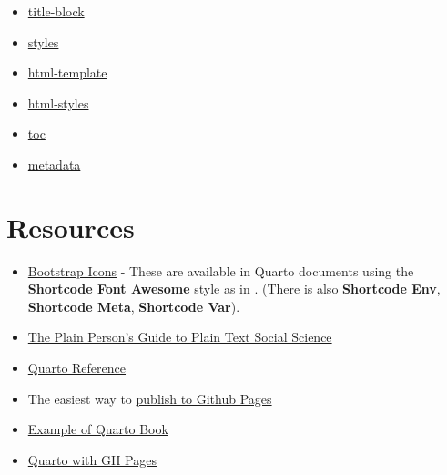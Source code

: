 \documentclass[
  10pt,
  oneside,
  cleardoublepage=empty,
  numbers=noenddot,
  titlepage,
  toclink=all,
  toc=bibliography,
  headinclude,
  footinclude]{scrbook}
\providecommand{\tightlist}{%
  \setlength{\itemsep}{0pt}\setlength{\parskip}{0pt}}\usepackage{longtable,booktabs,array}
\theoremstyle{plain}
\theoremstyle{plain}
\theoremstyle{definition}
\theoremstyle{definition}
\theoremstyle{plain}
\theoremstyle{plain}
\theoremstyle{definition}
\theoremstyle{plain}
\theoremstyle{remark}
\begin{document}
\begin{tcolorbox}[enhanced jigsaw, bottomrule=.15mm, bottomtitle=1mm, rightrule=.15mm, opacityback=0, coltitle=black, colback=white, left=2mm, arc=.35mm, colbacktitle=quarto-callout-note-color!10!white, breakable, toptitle=1mm, colframe=quarto-callout-note-color-frame, toprule=.15mm, titlerule=0mm, title=\textcolor{quarto-callout-note-color}{\faInfo}\hspace{0.5em}{HTML}, leftrule=.75mm, opacitybacktitle=0.6]

\begin{itemize}
\tightlist
\item
  \href{_extensions/templates/html/title-block.html}{title-block}
\item
  \href{_extensions/templates/html/styles.html}{styles}
\item
  \href{_extensions/templates/html/html.template}{html-template}
\item
  \href{_extensions/templates/html/html.styles}{html-styles}
\item
  \href{_extensions/templates/html/toc.html}{toc}
\item
  \href{_extensions/templates/html/metadata.html}{metadata}
\end{itemize}

\end{tcolorbox}

\chapter{Resources}\label{resources}

\begin{itemize}
\tightlist
\item
  \href{https://icons.getbootstrap.com}{Bootstrap Icons} - These are
  available in Quarto documents using the \textbf{Shortcode Font
  Awesome} style as in \texttt{} . (There is also
  \textbf{Shortcode Env}, \textbf{Shortcode Meta}, \textbf{Shortcode
  Var}).
\item
  \href{https://plain-text.co/index.html\#introduction}{The Plain
  Person's Guide to Plain Text Social Science}
\item
  \href{https://quarto.org/docs/reference/}{Quarto Reference}
\item
  The easiest way to
  \href{quarto.org/docs/publishing/github-pages.html\#render-to-docs}{publish
  to Github Pages}
\item
  \href{https://github.com/jjallaire/hopr/blob/master/_quarto.yml}{Example
  of Quarto Book}
\item
  \href{https://tarleb.com/posts/quarto-with-gh-pages/}{Quarto with GH
  Pages}
\end{itemize}
\end{document}
